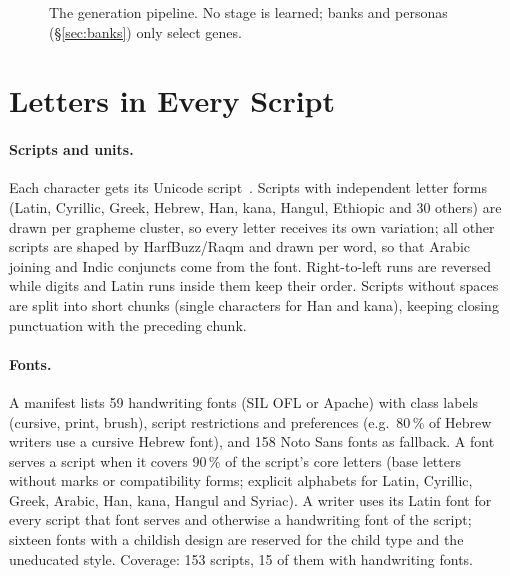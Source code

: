 \documentclass[10pt,twocolumn]{article}
\begin{document}
\begin{figure}[t]
\centering
{}
\caption{The generation pipeline. No stage is learned; banks and personas (\S\ref{sec:banks}) only select genes.}
\label{fig:pipeline}
\end{figure}

\section{Letters in Every Script}
\label{sec:letters}

\paragraph{Scripts and units.} Each character gets its Unicode script~\cite{unicode}. Scripts with independent
letter forms (Latin, Cyrillic, Greek, Hebrew, Han, kana, Hangul, Ethiopic and 30 others) are drawn per grapheme
cluster, so every letter receives its own variation; all other scripts are shaped by HarfBuzz/Raqm and drawn per
word, so that Arabic joining and Indic conjuncts come from the font. Right-to-left runs are reversed while digits
and Latin runs inside them keep their order. Scripts without spaces are split into short chunks (single characters
for Han and kana), keeping closing punctuation with the preceding chunk.

\paragraph{Fonts.} A manifest lists 59 handwriting fonts (SIL OFL or Apache) with class labels (cursive, print,
brush), script restrictions and preferences (e.g.\ 80\,\% of Hebrew writers use a cursive Hebrew font), and 158
Noto Sans fonts as fallback. A font serves a script when it covers 90\,\% of the script's core letters (base
letters without marks or compatibility forms; explicit alphabets for Latin, Cyrillic, Greek, Arabic, Han, kana,
Hangul and Syriac). A writer uses its Latin font for every script that font serves and otherwise a handwriting
font of the script; sixteen fonts with a childish design are reserved for the child type and the uneducated
style. Coverage: 153 scripts, 15 of them with handwriting fonts.
\end{document}
